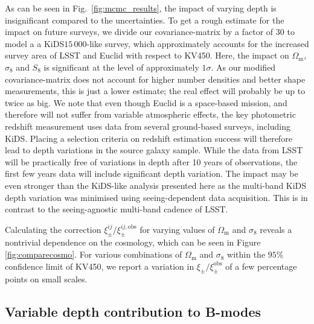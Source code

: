 \documentclass{aa}
\renewcommand{\rm}{\mathrm}
\begin{document}
As can be seen in Fig.~\ref{fig:mcmc_results}, the impact of varying depth is insignificant compared to the uncertainties. To get a rough estimate for the impact on future surveys, we divide our covariance-matrix by a factor of 30 to model a a KiDS$15\,000$-like survey, which approximately accounts for the increased survey area of LSST and Euclid with respect to KV450. Here, the impact on $\Omega_{\rm m}$, $\sigma_8$ and $S_8$ is significant at the level of approximately $1\sigma$. As our modified covariance-matrix does not account for higher number densities and better shape measurements, this is just a lower estimate; the real effect will probably be up to twice as big. We note that even though Euclid is a space-based mission, and therefore will not suffer from variable atmospheric effects, the key photometric redshift measurement uses data from several ground-based surveys, including KiDS.   Placing a selection criteria on redshift estimation success will therefore lead to depth variations in the source galaxy sample. While the data from LSST will be practically free of variations in depth after 10 years of observations, the first few years data will include significant depth variation. The impact may be even stronger than the KiDS-like analysis presented here as the multi-band KiDS depth variation was minimised using seeing-dependent data acquisition. This is in contrast to the seeing-agnostic multi-band cadence of LSST.


Calculating the correction $\xi_\pm^{ij}/\xi_\pm^{ij,\rm{obs}}$ for varying values of $\Omega_{\rm{m}}$ and $\sigma_8$ reveals a nontrivial dependence on the cosmology, which can be seen in Figure \ref{fig:comparecosmo}. For various combinations of $\Omega_{\rm{m}}$ and $\sigma_8$ within the $95\%$ confidence limit of KV450, we report a variation in $\xi_\pm/\xi_\pm^{\rm{obs}}$ of a few percentage points on small scales.

\subsection{Variable depth contribution to B-modes}
\end{document}
